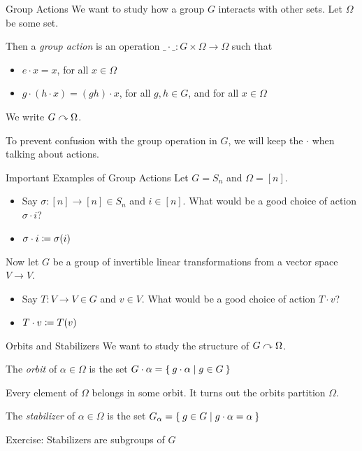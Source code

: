 \documentclass[aspectratio=169]{beamer}
\begin{document}
\begin{frame}{Group Actions}
    We want to study how a group $G$ interacts with other sets. \pause
    Let $\Omega$ be some set.
    
    \begin{defn}
        Then a \emph{group action} is an operation $\_ \cdot \_ \colon G \times \Omega \to \Omega$ such that \pause
        \begin{itemize}
            \item $e\cdot x = x$, for all $x\in \Omega$ \pause
            \item $g\cdot(h\cdot x) = (gh)\cdot x$, for all $g,h\in G$, and for all $x\in \Omega$
        \end{itemize}
    We write $G \curvearrowright \Omega$.
    \end{defn}
    
    To prevent confusion with the group operation in $G$, we will keep the $\cdot$ when talking about actions.
\end{frame}

\begin{frame}{Important Examples of Group Actions}
    Let $G = S_n$ and $\Omega = [n]$. \pause
    \begin{itemize}
        \item Say $\sigma\colon [n] \to [n] \in S_n$ and $i \in [n]$. 
            What would be a good choice of action $\sigma \cdot i$? \pause
        \item $\sigma \cdot i \coloneqq \sigma(i)$ \pause
    \end{itemize}

    Now let $G$ be a group of invertible linear transformations from a vector space $V \to V$. \pause
    \begin{itemize}
        \item Say $T\colon V \to V \in G$ and $v \in V$. 
            What would be a good choice of action $T \cdot v$? \pause
        \item $T \cdot v \coloneqq T(v)$
    \end{itemize}
    
\end{frame}

\begin{frame}{Orbits and Stabilizers}
    We want to study the structure of $G \curvearrowright \Omega$.

    \begin{defn}
        The \emph{orbit} of $\alpha \in \Omega$ is the set $G \cdot \alpha = \Set{g \cdot \alpha | g \in G}$
    \end{defn} \pause

    Every element of $\Omega$ belongs in some orbit.
    It turns out the orbits partition $\Omega$. \pause

    \begin{defn}
        The \emph{stabilizer} of $\alpha \in \Omega$ is the set $G_\alpha = \Set{g \in G | g \cdot \alpha = \alpha}$
    \end{defn} \pause

    \textcolor{sigma@alertred}{Exercise:} Stabilizers are subgroups of $G$
\end{frame}
\end{document}

